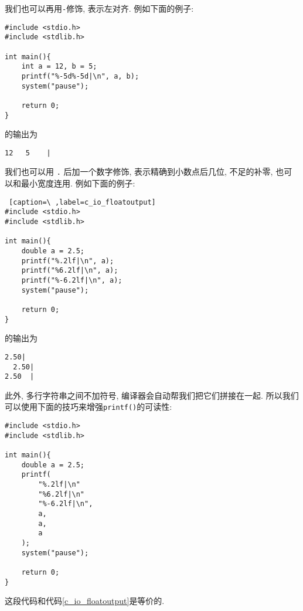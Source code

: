             我们也可以再用\texttt{-}修饰, 表示左对齐. 例如下面的例子:
\begin{lstlisting}
#include <stdio.h>
#include <stdlib.h>

int main(){
    int a = 12, b = 5;
    printf("%-5d%-5d|\n", a, b);
    system("pause");

    return 0;
}
\end{lstlisting}
            的输出为
\begin{lstlisting}
12   5    |
\end{lstlisting}

            我们也可以用 \texttt{.} 后加一个数字修饰, 表示精确到小数点后几位, 不足的补零, 也可以和最小宽度连用. 例如下面的例子:
\begin{lstlisting} [caption=\ ,label=c_io_floatoutput]
#include <stdio.h>
#include <stdlib.h>

int main(){
    double a = 2.5;
    printf("%.2lf|\n", a);
    printf("%6.2lf|\n", a);
    printf("%-6.2lf|\n", a);
    system("pause");

    return 0;
}
\end{lstlisting}
            的输出为
\begin{lstlisting}
2.50|
  2.50|
2.50  |
\end{lstlisting}

            此外, 多行字符串之间不加符号, 编译器会自动帮我们把它们拼接在一起. 所以我们可以使用下面的技巧来增强\texttt{printf()}的可读性:
\begin{lstlisting}
#include <stdio.h>
#include <stdlib.h>

int main(){
    double a = 2.5;
    printf(
        "%.2lf|\n"
        "%6.2lf|\n"
        "%-6.2lf|\n",
        a,
        a,
        a
    );
    system("pause");

    return 0;
}
\end{lstlisting}

            这段代码和代码\ref{c_io_floatoutput}是等价的.

